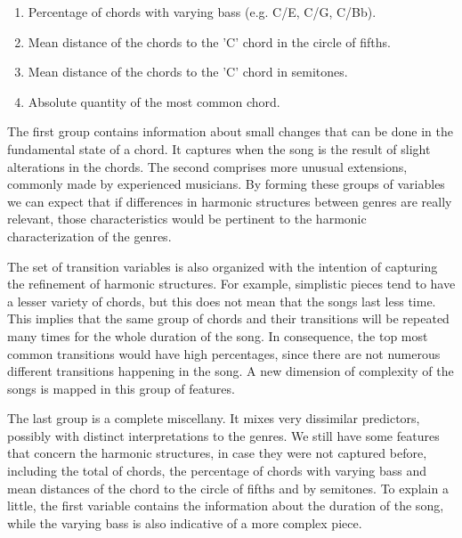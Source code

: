 \documentclass[twocolumn]{article}
\begin{document}
\begin{itemize}
\begin{enumerate}
\item Percentage of chords with varying bass
(e.g. C/E, C/G, C/Bb).

\item Mean distance of the chords to the 'C' chord
in the circle of fifths. 

\item Mean distance of the chords to the 'C' chord
in semitones.  

\item Absolute quantity of the most common
chord.

\end{enumerate}
\end{itemize}

The first group contains information about small 
changes that can be done in the fundamental state of
a chord. It captures when the song is the result
of slight alterations in the chords. 
The second comprises more unusual
extensions, commonly made by experienced musicians. 
By forming these groups of variables
we can expect that if
differences in harmonic structures
between genres are really relevant, 
those characteristics would be pertinent to 
the harmonic characterization of the genres. 

The set of transition variables is also 
organized with the intention of capturing the
refinement of harmonic structures. For example, 
simplistic pieces tend to have a lesser variety of 
chords, but this does not mean that the songs last
less time. This implies that the same group of chords
and their transitions will be repeated many 
times for the whole duration of the song. 
In consequence, the top most common transitions 
would have high percentages, since there are not 
numerous different transitions happening in the song.
A new dimension of complexity of the songs is 
mapped in this group of features. 

The last group is a complete miscellany. 
It mixes very dissimilar predictors, 
possibly with distinct interpretations 
to the genres. We still have some features 
that concern the harmonic structures, 
in case they were not captured before,
including the total of chords, the percentage of chords with varying bass and mean distances
of the chord to the circle of fifths and by
semitones. To explain a little, 
the first variable contains
the information about the duration of the song,
while the varying bass is also indicative 
of a more complex piece. 
\end{document}
